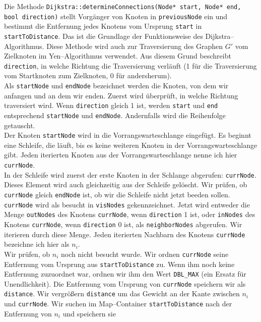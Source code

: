 \documentclass[a4paper,10pt,ngerman]{scrartcl}
\begin{document}
Die Methode \texttt{Dijkstra::determineConnections(Node* start, Node* end, bool direction)} stellt 
Vorgänger von Knoten in \texttt{previousNode} ein und bestimmt die Entfernung jedes Knotens vom Ursprung \texttt{start} in
\texttt{startToDistance}. Das ist die Grundlage der Funktionsweise des Dijkstra--Algorithmus.
Diese Methode wird auch zur Traversierung des Graphen $G'$ vom Zielknoten im Yen--Algorithmus verwendet.
Aus diesem Grund beschreibt \texttt{direction}, in welche Richtung die Traversierung verläuft (1 für die Traversierung
vom Startknoten zum Zielknoten, 0 für andersherum).\\
Als \texttt{startNode} und \texttt{endNode} bezeichnet werden die Knoten, von dem
wir anfangen und an dem wir enden.
Zuerst wird überprüft, in welche Richtung traversiert wird. Wenn \texttt{direction}
gleich 1 ist, werden \texttt{start} und \texttt{end} entsprechend 
\texttt{startNode} und \texttt{endNode}. Andernfalls wird die Reihenfolge getauscht.\\
Der Knoten \texttt{startNode} wird in die Vorrangswarteschlange eingefügt. 
Es beginnt eine Schleife, die läuft, bis es keine weiteren Knoten in der Vorrangswarteschlange gibt.
Jeden iterierten Knoten aus der Vorrangswarteschlange nenne ich hier \texttt{currNode}.\\
In der Schleife wird zuerst der erste Knoten in der Schlange abgerufen: \texttt{currNode}.
Dieses Element wird auch gleichzeitig aus der Schleife gelöscht.
Wir prüfen, ob \texttt{currNode} gleich \texttt{endNode} ist, ob wir die Schleife
nicht jetzt beeden sollen.\\
\texttt{currNode} wird als besucht in \texttt{visNodes} gekennzeichnet. 
Jetzt wird entweder die Menge \texttt{outNodes} des Knotens \texttt{currNode}, wenn \texttt{direction} 1 ist, 
oder \texttt{inNodes} des Knotens \texttt{currNode}, wenn \texttt{direction} 0 ist, als \texttt{neighborNodes}
abgerufen. Wir iterieren durch diese Menge. Jeden iterierten Nachbarn des Knotens \texttt{currNode} bezeichne ich hier
als $n_i$.\\
Wir prüfen, ob $n_i$ noch nicht besucht wurde. Wir ordnen \texttt{currNode} seine Entfernung vom Ursprung aus 
\texttt{startToDistance} zu. Wenn ihm noch keine Entfernung zuzuordnet war, ordnen wir ihm den Wert \texttt{DBL\_MAX}
(ein Ersatz für Unendlichkeit). Die Entfernung vom Ursprung von \texttt{currNode} speichern wir als \texttt{distance}.
Wir vergrößern \texttt{distance} um das Gewicht an der Kante zwischen $n_i$ und \texttt{currNode}.
Wir suchen im Map--Container \texttt{startToDistance} nach der Entfernung von $n_i$ und speichern sie
\end{document}
